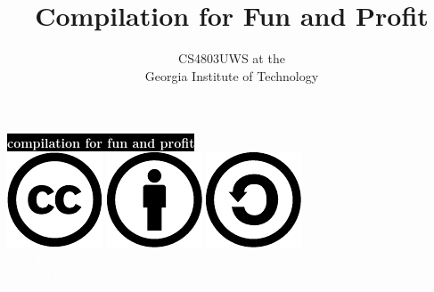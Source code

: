 \documentclass[mathserif,xcolor={dvipsnames,table}]{beamer}
\title{\textbf{Compilation for Fun and Profit}}
\date{}
\author{CS4803UWS at the\\
Georgia Institute of Technology
}
\begin{document}
{
%
\begin{frame}[plain]
\textcolor{white}{
%
\colorbox{black}{\textbf{compilation for fun and profit}}
}
\vspace{2.7in}
\\
\hfill\includegraphics[scale=.25]{images/cc-logo.pdf}
\includegraphics[scale=.25]{images/cc-new.pdf}
\includegraphics[scale=.25]{images/cc-share.pdf}
\textcolor{white}{
\\
\hfill \tiny{CC3.0 share-alike attribution}\\
}
\textcolor{white}{
\hfill \scriptsize{copyright \copyright\ 2013}\\
}
\end{frame}
}
\end{document}
